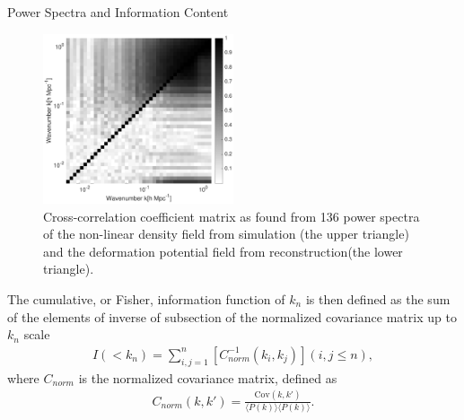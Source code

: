 \begin{section}{Power Spectra and Information Content}
\begin{figure}
 \centering
  \includegraphics[width=0.5\textwidth]{corr2-crop.pdf}
%
  \caption{Cross-correlation coefficient matrix as found from 136 power spectra of the non-linear density field from simulation (the upper triangle) and the deformation potential field from reconstruction(the lower triangle).}   

    \label{fig:corrall}
\end{figure}
    The cumulative, or Fisher, information function of $k_n$ is then defined as the sum of the elements of inverse of subsection of the normalized covariance matrix up to $k_n$ scale
\begin{align}
    I \left( < k_n\right) = \sum_{i,j=1}^n \left[ C^{-1}_{norm} \left( k_i,k_j \right)\right] \left( i,j \leq n \right),
\end{align}
where $C_{norm}$ is the normalized covariance matrix, defined as
\begin{align}
    C_{norm} \left( k,k' \right)=\frac{\mathrm{Cov}(k,k')}{\langle P(k)\rangle\langle P(k)\rangle}.
\end{align}
  

\end{section}
